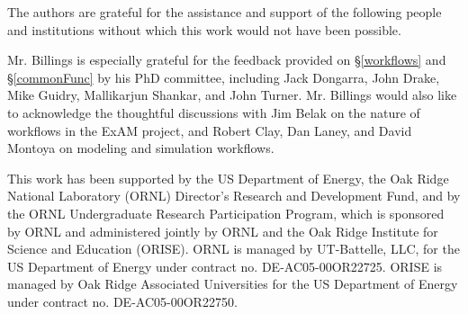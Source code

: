 \begin{acks}

The authors are grateful for the assistance and
support of the following people and institutions without which this work would
not have been possible.

Mr. Billings is especially grateful for the feedback provided on
\S\ref{workflows} and \S\ref{commonFunc} by his PhD committee, including Jack Dongarra, John Drake, Mike Guidry, Mallikarjun Shankar, and John Turner. Mr.
Billings would also like to acknowledge the thoughtful discussions with Jim
Belak on the nature of workflows in the ExAM project, and Robert Clay, Dan
Laney, and David Montoya on modeling and simulation workflows.

This work has been supported by the US Department of Energy, the Oak Ridge National Laboratory (ORNL) Director's Research and Development Fund, and by the ORNL
Undergraduate Research Participation Program, which is sponsored by ORNL and
administered jointly by ORNL and the Oak Ridge Institute for Science and
Education (ORISE). ORNL is managed by UT-Battelle, LLC, for the US Department
of Energy under contract no. DE-AC05-00OR22725. ORISE is managed by Oak Ridge
Associated Universities for the US Department of Energy under contract no.
DE-AC05-00OR22750.

\end{acks}